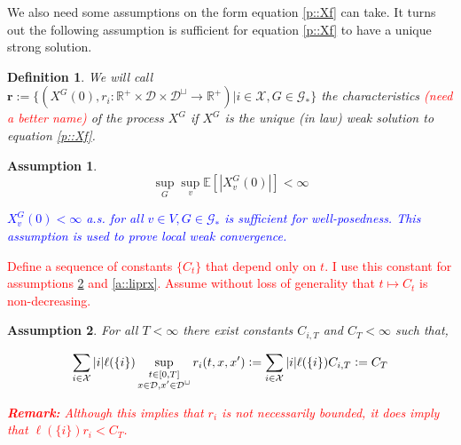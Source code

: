 \documentclass[12pt]{article}
\newcommand{\mb}{\mathbb}
\newcommand{\mc}{\mathcal}
\newcommand{\ra}{\rightarrow}
\newcommand{\tr}{\textcolor{red}}
\newcommand{\tb}{\textcolor{blue}}
\newcommand{\remark}{\textbf{Remark: }}
\newcommand{\ex}[1]{\mb{E}\left[#1\right]}			%
\newcommand{\defeq}{:=}								%
\newcommand{\cad}{\mc{D}}							%
\newcommand{\sta}{\mc{X}}							%
\newcommand{\Xf}{X}									%
\newcommand{\Sm}{\ell}								%
\newcommand{\rate}{r}								%
\newcommand{\xf}{x}									%
\newcommand{\vind}[1]{_{#1}}						%
\newcommand{\tme}[1]{(#1)}							%
\newcommand{\gind}[1]{^{#1}}						%
\newcommand{\stpara}[1]{_{#1}}						%
\newcommand{\rateset}{\mathbf{\rate}}				%
\newcommand{\jumpbd}[1]{C_{#1}}						%
\newcommand{\jumpibd}[2]{C_{#1,#2}}					%
\newcommand{\Gs}{\mc{G}_\ast}						%
\newcommand{\tmepro}[3]{
\ifstrempty{#3}{
	(#1,#2)}{
	(#1,#2,#3)}}									%
\newtheorem{defn}[thms]{Definition}
\newtheorem{assu}{Assumption}
\begin{document}
We also need some assumptions on the form equation \eqref{p::Xf} can take. It turns out the following assumption is sufficient for equation \eqref{p::Xf} to have a unique strong solution.

\begin{defn}
We will call \(\rateset \defeq \{(\Xf\gind{G}\tme{0},\rate\stpara{i}:\mb{R}^+\times\cad\times\cad^\sqcup\ra\mb{R}^+)|i \in \sta,G \in \Gs\}\) the characteristics \tr{(need a better name)} of the process \(\Xf\gind{G}\) if \(\Xf\gind{G}\) is the unique (in law) weak solution to equation \eqref{p::Xf}.
\end{defn}

\begin{assu}
\begin{equation}
\sup_G\sup_v \ex{|\Xf\gind{G}\vind{v}\tme{0}|} < \infty
\label{a::bddstart}
\end{equation}

\tb{\(\Xf\gind{G}\vind{v}\tme{0} < \infty\) a.s. for all \(v \in V, G \in \Gs\) is sufficient for well-posedness. This assumption is used to prove local weak convergence.}
\label{a::bddinit}
\end{assu}

\tr{Define a sequence of constants \(\{\jumpbd{t}\}\) that depend only on \(t\). I use this constant for assumptions \ref{a::bddr} and \ref{a::liprx}. Assume without loss of generality that \(t \mapsto \jumpbd{t}\) is non-decreasing.}

\begin{assu}
\item For all \(T < \infty\) there exist constants \(\jumpibd{i}{T}\) and \(\jumpbd{T} < \infty\) such that,

\begin{equation}
\sum_{i \in \sta}|i|\Sm(\{i\})\sup_{\substack{t \in [0,T]\\\xf \in \cad,\xf' \in \cad^\sqcup}} \rate\stpara{i}\tmepro{t}{\xf}{\xf'} \defeq \sum_{i \in \sta}|i|\Sm(\{i\})\jumpibd{i}{T} \defeq \jumpbd{T}
\label{a::bddjmp}
\end{equation}

\tr{\remark Although this implies that \(\rate\stpara{i}\) is not necessarily bounded, it does imply that \(\Sm(\{i\})\rate\stpara{i} < \jumpbd{T}\).}
\label{a::bddr}
\end{assu}
\end{document}
